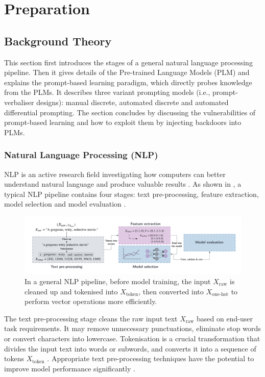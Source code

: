 \chapter{Preparation}
\section{Background Theory}
This section first introduces the stages of a general natural language processing pipeline. Then it gives details of the Pre-trained Language Models (PLM) and explains the prompt-based learning paradigm, which directly probes knowledge from the PLMs. It describes three variant prompting models (i.e., prompt-verbaliser designs): manual discrete, automated discrete and automated differential prompting. The section concludes by discussing the vulnerabilities of prompt-based learning and how to exploit them by injecting backdoors into PLMs. 

\subsection{Natural Language Processing (NLP)}
NLP is an active research field investigating how computers can better understand natural language and produce valuable results \cite{chowdhary20nlp}. As shown in , a typical NLP pipeline contains four stages: text pre-processing, feature extraction, model selection and model evaluation \cite{Vajjala20nlp}.

\begin{figure}[!ht]
    \centering
    \includegraphics[width=\hsize]{figures/preparation_media/prepare-pipeline.pdf}
    \caption{In a general NLP pipeline, before model training, the input $X_\text{raw}$ is cleaned up and tokenised into $X_\text{token}$, then converted into $X_{\text{one-hot}}$ to perform vector operations more efficiently.}
    \label{fig:prepare-pipeline}
\end{figure}

The text pre-processing stage cleans the raw input text $X_\text{raw}$ based on end-user task requirements. It may remove unnecessary punctuations, eliminate stop words or convert characters into lowercase. Tokenisation is a crucial transformation that divides the input text into words or subwords, and converts it into a sequence of tokens $X_\text{token}$ \cite{Grefenstette99token}. Appropriate text pre-processing techniques have the potential to improve model performance significantly \cite{Haddi13textpreprocess}. 

